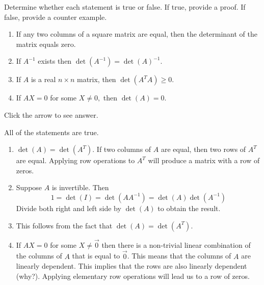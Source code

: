 \documentclass{ximera}
\begin{document}
\begin{problem}\label{prb:7.21} Determine whether each statement is true or false. If true, provide a proof. If false, provide a counter example.
\begin{enumerate}

\item If any two columns of a square matrix are equal, then the determinant
of the matrix equals zero.

\item If $A^{-1}$ exists then $\det \left( A^{-1}\right) =\det \left(
A\right) ^{-1}.$

\item If $A$ is a real $n\times n$ matrix, then $\det \left( A^{T}A\right)
\geq 0.$

\item If $AX=0$ for some $X \neq 0,$ then $\det \left(
A\right) =0.$
\end{enumerate}

Click the arrow to see answer.
\begin{expandable}{}{}
All of the statements are true.
\begin{enumerate}
\item $\det(A)=\det(A^T)$.  If two columns of $A$ are equal, then two rows of $A^T$ are equal.  Applying row operations to $A^T$ will produce a matrix with a row of zeros.
\item Suppose $A$ is invertible.  Then 
$$1=\det(I)=\det(AA^{-1})=\det(A)\det(A^{-1})$$  Divide both right and left side by $\det(A)$ to obtain the result.
\item This follows from the fact that $\det(A)=\det(A^T)$.
\item If $AX=0$ for some $X \neq \vec{0}$ then there is a non-trivial linear combination of the columns of $A$ that is equal to $\vec{0}$.  This means that the columns of $A$ are linearly dependent.  This implies that the rows are also linearly dependent (why?).  Applying elementary row operations will lead us to a row of zeros.
\end{enumerate}
\end{expandable}
\end{problem}
\end{document}
